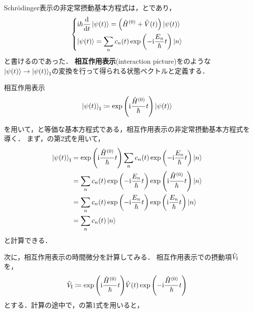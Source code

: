 \documentclass{report}
\begin{document}
  Schr\"odinger表示の非定常摂動基本方程式は，とであり，
  \begin{align}
    \begin{dcases}
      \mathrm{i}\hbar\dv{t}\ket{\psi(t)} = \qty(\hat{H}^{(0)} + \hat{V}(t))\ket{\psi(t)} \label{time-dependent-schrodinger-eq-re} \\
      \ket{\psi(t)} = \sum_{n}c_n(t)\exp\qty(-\mathrm{i}\frac{E_n}{\hbar}t)\ket{n}
    \end{dcases}
  \end{align}
  と書けるのであった．
  \textbf{相互作用表示}(interaction picture)をのような$\ket{\psi(t)} \to \ket{\psi(t)}_{\mathrm{I}}$の変換を行って得られる状態ベクトルと定義する．
  \begin{itembox}[l]{相互作用表示}
    \begin{align}
      \ket{\psi(t)}_{\mathrm{I}} \coloneqq \exp\qty(\mathrm{i}\frac{\hat{H}^{(0)}}{\hbar}t)\ket{\psi(t)}\label{interaction-picture}
    \end{align}
  \end{itembox}
  を用いて，と等価な基本方程式である，相互作用表示の非定常摂動基本方程式を導く．
  まず，の第2式を用いて，
  \begin{align}
    \ket{\psi(t)}_{\mathrm{I}} &= \exp\qty(\mathrm{i}\frac{\hat{H}^{(0)}}{\hbar}t)\sum_{n}c_n(t)\exp\qty(-\mathrm{i}\frac{E_n}{\hbar}t)\ket{n}\\
    &= \sum_{n}c_n(t)\exp\qty(-\mathrm{i}\frac{E_n}{\hbar}t)\exp\qty(\mathrm{i}\frac{\hat{H}^{(0)}}{\hbar}t)\ket{n} \\ 
    &= \sum_{n}c_n(t)\exp\qty(-\mathrm{i}\frac{E_n}{\hbar}t)\exp\qty(\mathrm{i}\frac{E_n}{\hbar}t)\ket{n} \\ 
    &= \sum_{n}c_n(t)\ket{n} \label{psi-t-cnt}
  \end{align}
  と計算できる．
  \par
  次に，相互作用表示の時間微分を計算してみる．
  相互作用表示での摂動項$\hat{V}_{\mathrm{I}}$を，
  \begin{align}
    \hat{V}_{\mathrm{I}} \coloneqq \exp\qty(\mathrm{i}\frac{\hat{H}^{(0)}}{\hbar}t)\hat{V}(t)\exp\qty(-\mathrm{i}\frac{\hat{H}^{(0)}}{\hbar}t) \label{time-dependent-schrodinger-eq-re-2nd-eq-interaction-picture}
  \end{align}
  とする．計算の途中で，の第1式を用いると，
\end{document}
